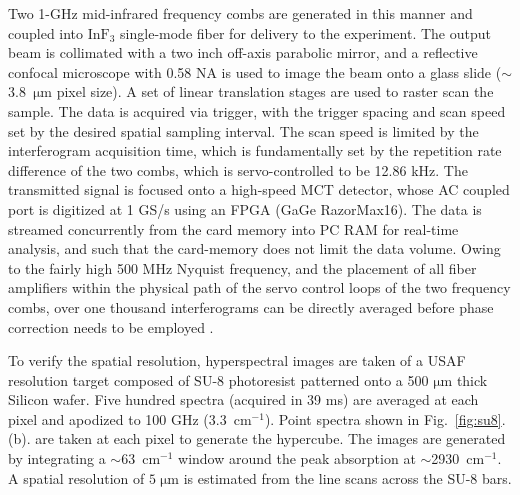 \documentclass[aip,reprint]{revtex4-1}
\begin{document}
Two 1-GHz mid-infrared frequency combs are generated in this manner and coupled into $\mathrm{InF_3}$ single-mode fiber for delivery to the experiment. The output beam is collimated with a two inch off-axis parabolic mirror, and a reflective confocal microscope with 0.58 NA is used to image the beam onto a glass slide (\mbox{$\sim$3.8 $\mathrm{\mu m}$} pixel size). A set of linear translation stages are used to raster scan the sample. The data is acquired via trigger, with the trigger spacing and scan speed set by the desired spatial sampling interval. The scan speed is limited by the interferogram acquisition time, which is fundamentally set by the repetition rate difference of the two combs, which is servo-controlled to be 12.86 kHz. The transmitted signal is focused onto a high-speed MCT detector, whose AC coupled port is digitized at 1 GS/s using an FPGA (GaGe RazorMax16). The data is streamed concurrently from the card memory into PC RAM for real-time analysis, and such that the card-memory does not limit the data volume. Owing to the fairly high 500 MHz Nyquist frequency, and the placement of all fiber amplifiers within the physical path of the servo control loops of the two frequency combs, over one thousand interferograms can be directly averaged before phase correction needs to be employed \cite{hebertSelfcorrectedChipbasedDualcomb2017,hebertSelfCorrectionLimitsDualComb2019}.

To verify the spatial resolution, hyperspectral images are taken of a USAF resolution target composed of SU-8 photoresist patterned onto a 500 $\mathrm{\mu m}$ thick Silicon wafer. Five hundred spectra (acquired in 39 ms) are averaged at each pixel and apodized to 100 GHz (\mbox{3.3 $\mathrm{cm^{-1}}$}). Point spectra shown in \mbox{Fig. \ref{fig:su8}.(b).} are taken at each pixel to generate the hypercube. The images are generated by integrating a \mbox{$\sim$63 $\mathrm{cm^{-1}}$} window around the peak absorption at \mbox{$\sim$2930 $\mathrm{cm^{-1}}$}. A spatial resolution of \mbox{$5 \; \mathrm{\mu m}$} is estimated from the line scans across the SU-8 bars.

\end{document}
